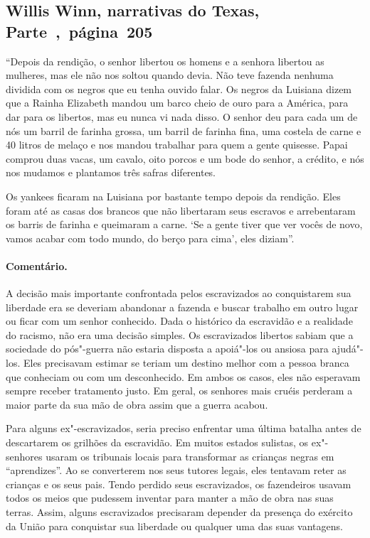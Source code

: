 \subsection{Willis Winn, narrativas do Texas, Parte~,~página~205}
\label{ref305}

``Depois da rendição, o senhor libertou os homens e a senhora libertou
as mulheres, mas ele não nos soltou quando devia. Não teve fazenda
nenhuma dividida com os negros que eu tenha ouvido falar. Os negros da
Luisiana dizem que a Rainha Elizabeth mandou um barco cheio de ouro para
a América, para dar para os libertos, mas eu nunca vi nada disso. O
senhor deu para cada um de nós um barril de farinha grossa, um barril de
farinha fina, uma costela de carne e 40 litros de melaço e nos mandou
trabalhar para quem a gente quisesse. Papai comprou duas vacas, um
cavalo, oito porcos e um bode do senhor, a crédito, e nós nos mudamos e
plantamos três safras diferentes.

Os yankees ficaram na Luisiana por bastante tempo depois da rendição.
Eles foram até as casas dos brancos que não libertaram seus escravos e
arrebentaram os barris de farinha e queimaram a carne. `Se a gente tiver
que ver vocês de novo, vamos acabar com todo mundo, do berço para cima',
eles diziam''.

\paragraph{Comentário.}\quad
{\small
A decisão mais importante confrontada pelos escravizados ao
conquistarem sua liberdade era se deveriam abandonar a fazenda e buscar
trabalho em outro lugar ou ficar com um senhor conhecido. Dada o
histórico da escravidão e a realidade do racismo, não era uma decisão
simples. Os escravizados libertos sabiam que a sociedade do pós"-guerra não
estaria disposta a apoiá"-los ou ansiosa para ajudá"-los. Eles precisavam
estimar se teriam um destino melhor com a pessoa branca que conheciam ou
com um desconhecido. Em ambos os casos, eles não esperavam sempre
receber tratamento justo. Em geral, os senhores mais cruéis perderam a
maior parte da sua mão de obra assim que a guerra acabou.

Para alguns ex"-escravizados, seria preciso enfrentar uma última
batalha antes de descartarem os grilhões da escravidão. Em muitos
estados sulistas, os ex"-senhores usaram os tribunais locais para
transformar as crianças negras em ``aprendizes''. Ao se converterem nos
seus tutores legais, eles tentavam reter as crianças e os seus pais.
Tendo perdido seus escravizados, os fazendeiros usavam todos os meios que
pudessem inventar para manter a mão de obra nas suas terras. Assim,
alguns escravizados precisaram depender da presença do exército da União
para conquistar sua liberdade ou qualquer uma das suas vantagens.
}

